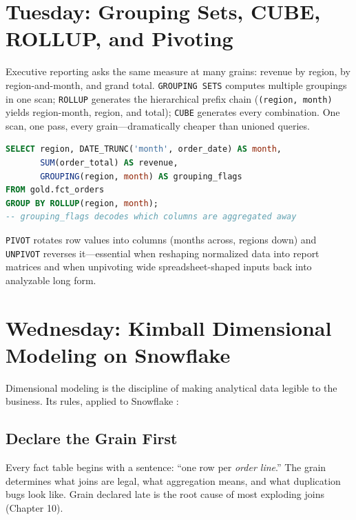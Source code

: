 \section{Tuesday: Grouping Sets, CUBE, ROLLUP, and Pivoting}
Executive reporting asks the same measure at many grains: revenue by region, by region-and-month, and grand total. \texttt{GROUPING SETS} computes multiple groupings in one scan; \texttt{ROLLUP} generates the hierarchical prefix chain (\texttt{(region, month)} yields region-month, region, and total); \texttt{CUBE} generates every combination. One scan, one pass, every grain---dramatically cheaper than unioned queries.

\begin{lstlisting}[language=SQL, caption={Multi-grain revenue in a single scan}]
SELECT region, DATE_TRUNC('month', order_date) AS month,
       SUM(order_total) AS revenue,
       GROUPING(region, month) AS grouping_flags
FROM gold.fct_orders
GROUP BY ROLLUP(region, month);
-- grouping_flags decodes which columns are aggregated away
\end{lstlisting}

\texttt{PIVOT} rotates row values into columns (months across, regions down) and \texttt{UNPIVOT} reverses it---essential when reshaping normalized data into report matrices and when unpivoting wide spreadsheet-shaped inputs back into analyzable long form.

\section{Wednesday: Kimball Dimensional Modeling on Snowflake}
Dimensional modeling is the discipline of making analytical data legible to the business. Its rules, applied to Snowflake \cite{kimball2013toolkit}:

\subsection{Declare the Grain First}
Every fact table begins with a sentence: ``one row per \emph{order line}.'' The grain determines what joins are legal, what aggregation means, and what duplication bugs look like. Grain declared late is the root cause of most exploding joins (Chapter 10).

